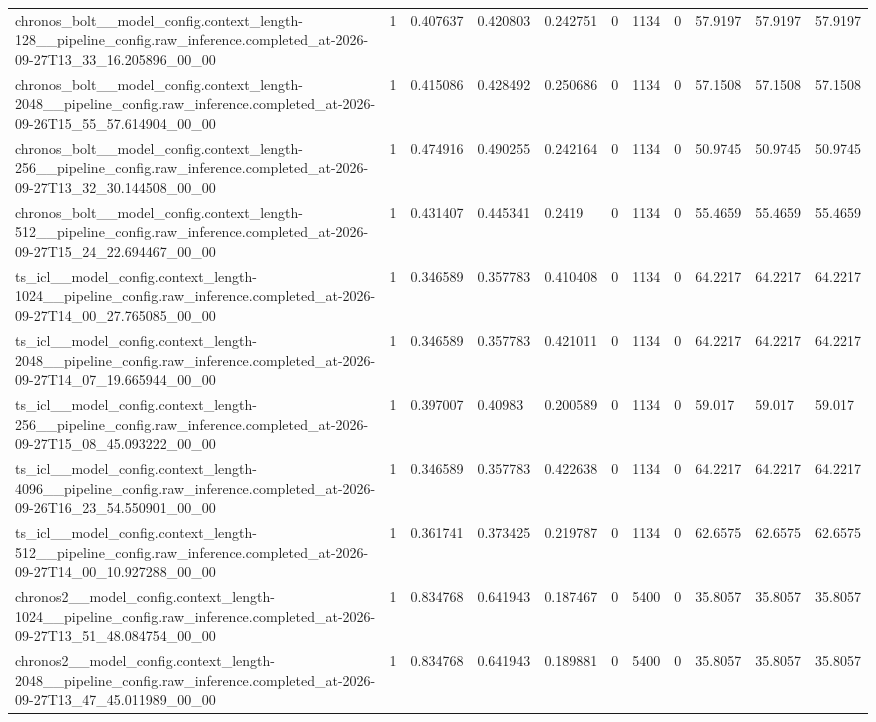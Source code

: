 \begin{tabular}{lllllllllll}
chronos\_bolt\_\_model\_config.context\_length-128\_\_pipeline\_config.raw\_inference.completed\_at-2026-09-27T13\_33\_16.205896\_00\_00 & 1 & 0.407637 & 0.420803 & 0.242751 & 0 & 1134 & 0 & 57.9197 & 57.9197 & 57.9197 \\
chronos\_bolt\_\_model\_config.context\_length-2048\_\_pipeline\_config.raw\_inference.completed\_at-2026-09-26T15\_55\_57.614904\_00\_00 & 1 & 0.415086 & 0.428492 & 0.250686 & 0 & 1134 & 0 & 57.1508 & 57.1508 & 57.1508 \\
chronos\_bolt\_\_model\_config.context\_length-256\_\_pipeline\_config.raw\_inference.completed\_at-2026-09-27T13\_32\_30.144508\_00\_00 & 1 & 0.474916 & 0.490255 & 0.242164 & 0 & 1134 & 0 & 50.9745 & 50.9745 & 50.9745 \\
chronos\_bolt\_\_model\_config.context\_length-512\_\_pipeline\_config.raw\_inference.completed\_at-2026-09-27T15\_24\_22.694467\_00\_00 & 1 & 0.431407 & 0.445341 & 0.2419 & 0 & 1134 & 0 & 55.4659 & 55.4659 & 55.4659 \\
ts\_icl\_\_model\_config.context\_length-1024\_\_pipeline\_config.raw\_inference.completed\_at-2026-09-27T14\_00\_27.765085\_00\_00 & 1 & 0.346589 & 0.357783 & 0.410408 & 0 & 1134 & 0 & 64.2217 & 64.2217 & 64.2217 \\
ts\_icl\_\_model\_config.context\_length-2048\_\_pipeline\_config.raw\_inference.completed\_at-2026-09-27T14\_07\_19.665944\_00\_00 & 1 & 0.346589 & 0.357783 & 0.421011 & 0 & 1134 & 0 & 64.2217 & 64.2217 & 64.2217 \\
ts\_icl\_\_model\_config.context\_length-256\_\_pipeline\_config.raw\_inference.completed\_at-2026-09-27T15\_08\_45.093222\_00\_00 & 1 & 0.397007 & 0.40983 & 0.200589 & 0 & 1134 & 0 & 59.017 & 59.017 & 59.017 \\
ts\_icl\_\_model\_config.context\_length-4096\_\_pipeline\_config.raw\_inference.completed\_at-2026-09-26T16\_23\_54.550901\_00\_00 & 1 & 0.346589 & 0.357783 & 0.422638 & 0 & 1134 & 0 & 64.2217 & 64.2217 & 64.2217 \\
ts\_icl\_\_model\_config.context\_length-512\_\_pipeline\_config.raw\_inference.completed\_at-2026-09-27T14\_00\_10.927288\_00\_00 & 1 & 0.361741 & 0.373425 & 0.219787 & 0 & 1134 & 0 & 62.6575 & 62.6575 & 62.6575 \\
chronos2\_\_model\_config.context\_length-1024\_\_pipeline\_config.raw\_inference.completed\_at-2026-09-27T13\_51\_48.084754\_00\_00 & 1 & 0.834768 & 0.641943 & 0.187467 & 0 & 5400 & 0 & 35.8057 & 35.8057 & 35.8057 \\
chronos2\_\_model\_config.context\_length-2048\_\_pipeline\_config.raw\_inference.completed\_at-2026-09-27T13\_47\_45.011989\_00\_00 & 1 & 0.834768 & 0.641943 & 0.189881 & 0 & 5400 & 0 & 35.8057 & 35.8057 & 35.8057 \\

\end{tabular}
